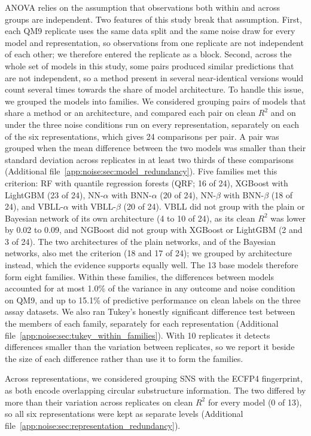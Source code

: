 ANOVA relies on the assumption that observations both within and across groups are independent. Two features of this study break that assumption. First, each QM9 replicate uses the same data split and the same noise draw for every model and representation, so observations from one replicate are not independent of each other; we therefore entered the replicate as a block. Second, across the whole set of models in this study, some pairs produced similar predictions that are not independent, so a method present in several near-identical versions would count several times towards the share of model architecture. To handle this issue, we grouped the models into families. We considered grouping pairs of models that share a method or an architecture, and compared each pair on clean $R^2$ and on \aucnorm{} under the three noise conditions run on every representation, separately on each of the six representations, which gives 24 comparisons per pair. A pair was grouped when the mean difference between the two models was smaller than their standard deviation across replicates in at least two thirds of these comparisons (Additional file~\ref{app:noise:sec:model_redundancy}). Five families met this criterion: RF with quantile regression forests (QRF; 16 of 24), XGBoost with LightGBM (23 of 24), NN-$\alpha$ with BNN-$\alpha$ (20 of 24), NN-$\beta$ with BNN-$\beta$ (18 of 24), and VBLL-$\alpha$ with VBLL-$\beta$ (20 of 24). VBLL did not group with the plain or Bayesian network of its own architecture (4 to 10 of 24), as its clean $R^2$ was lower by 0.02 to 0.09, and NGBoost did not group with XGBoost or LightGBM (2 and 3 of 24). The two architectures of the plain networks, and of the Bayesian networks, also met the criterion (18 and 17 of 24); we grouped by architecture instead, which the evidence supports equally well. The 13 base models therefore form eight families. Within these families, the differences between models accounted for at most 1.0\% of the variance in any outcome and noise condition on QM9, and up to 15.1\% of predictive performance on clean labels on the three assay datasets. We also ran Tukey's honestly significant difference test between the members of each family, separately for each representation (Additional file~\ref{app:noise:sec:tukey_within_families}). With 10 replicates it detects differences smaller than the variation between replicates, so we report it beside the size of each difference rather than use it to form the families.

Across representations, we considered grouping SNS with the ECFP4 fingerprint, as both encode overlapping circular substructure information. The two differed by more than their variation across replicates on clean $R^2$ for every model (0 of 13), so all six representations were kept as separate levels (Additional file~\ref{app:noise:sec:representation_redundancy}).

